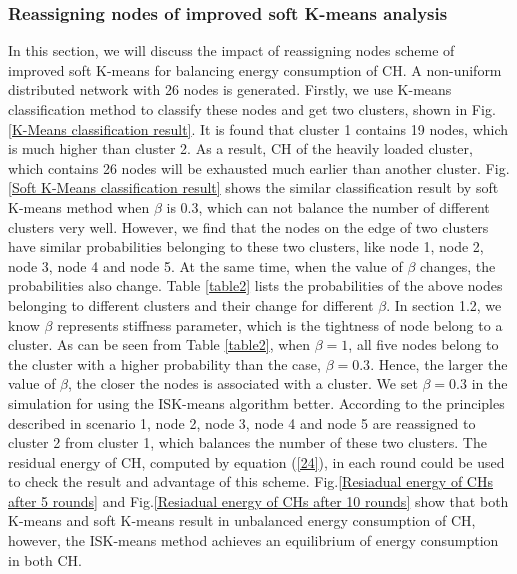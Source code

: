 \documentclass[11pt]{report}
\begin{document}
    \subsubsection{Reassigning nodes of improved soft K-means analysis}
    In this section, we will discuss the impact of reassigning nodes scheme of improved soft K-means for balancing energy consumption of CH. A non-uniform distributed network with 26 nodes is generated. Firstly, we use K-means classification method to classify these nodes and get two clusters, shown in Fig.\ref{K-Means classification result}. It is found that cluster 1 contains 19 nodes, which is much higher than cluster 2. As a result, CH of the heavily loaded cluster, which contains 26 nodes will be exhausted much earlier than another cluster. Fig.\ref{Soft K-Means classification result} shows the similar classification result by soft K-means method when $\beta$ is 0.3, which can not balance the number of different clusters very well. However, we find that the nodes on the edge of two clusters have similar probabilities belonging to these two clusters, like node 1, node 2, node 3, node 4 and node 5. At the same time, when the value of $\beta$ changes, the probabilities also change. Table \ref{table2} lists the probabilities of the above nodes belonging to different clusters and their change for different $\beta$. In section 1.2, we know $\beta$ represents stiffness parameter, which is the tightness of node belong to a cluster. As can be seen from Table \ref{table2}, 
    when $\beta = 1$, all five nodes belong to the cluster with a higher probability than the case, $\beta = 0.3$. Hence, the larger the value of $\beta$, the closer the nodes is associated with a cluster. We set $\beta= 0.3$ in the simulation for using the ISK-means algorithm better. According to the principles described in scenario 1, node 2, node 3, node 4 and node 5 are reassigned to cluster 2 from cluster 1, which balances the number of these two clusters. The residual energy of CH, computed by equation (\ref{24}), in each round could be used to check the result and advantage of this scheme. Fig.\ref{Resiadual energy of CHs after 5 rounds} and Fig.\ref{Resiadual energy of CHs after 10 rounds} show that both K-means and soft K-means result in unbalanced energy consumption of CH, however, the ISK-means method achieves an equilibrium of energy consumption in both CH.
    
\end{document}
